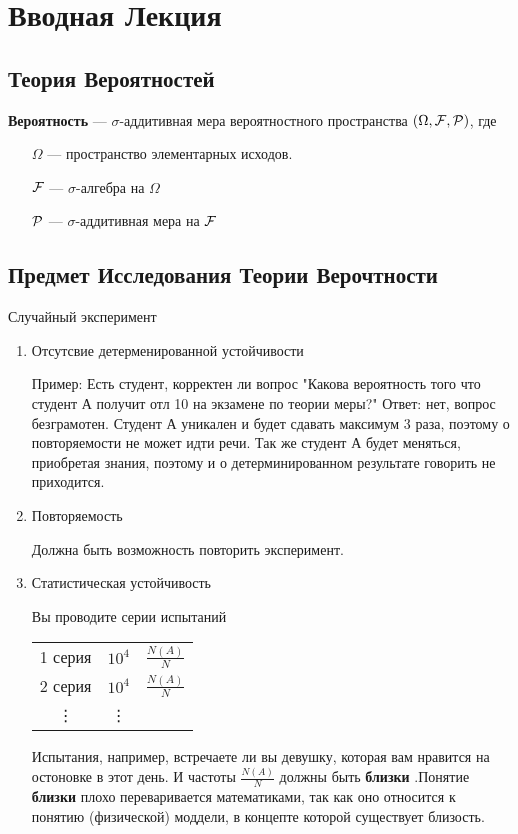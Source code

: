 \section{Вводная Лекция}

\subsection{Теория Вероятностей}

\begin{definition}
	\textbf{Вероятность} --- $\sigma$-аддитивная мера вероятностного пространства $(\Omega, \mathcal{F}, \mathcal{P})$, где
	\begin{enumerate}
		\item[$\Omega$] --- пространство элементарных исходов.
		\item[$\mathcal{F}$]  --- $\sigma$-алгебра на $\Omega$
		\item[$\mathcal{P}$] --- $\sigma$-аддитивная мера на $\mathcal{F}$
	\end{enumerate}
\end{definition}

\subsection{Предмет Исследования Теории Верочтности}

Случайный эксперимент
\begin{enumerate}
	\item Отсутсвие детерменированной устойчивости

		Пример: Есть студент, корректен ли вопрос "Какова вероятность того что студент А получит отл 10 на экзамене по теории меры?"
	Ответ: нет, вопрос безграмотен. Студент А уникален и будет сдавать максимум 3 раза, поэтому о повторяемости не может идти речи. Так же студент А будет меняться, приобретая знания, поэтому и о детерминированном результате говорить не приходится.

	\item Повторяемость

		Должна быть возможность повторить эксперимент.

	\item Статистическая устойчивость

		Вы проводите серии испытаний
		\begin{center}
		\begin{tabular}{ c c c }
			1 серия & $10^4$ & $\frac{N(A)}{N}$ \\
			2 серия & $10^4$ & $\frac{N(A)}{N}$ \\
			\vdots  & \vdots &\\
		\end{tabular}
		\end{center}
		Испытания, например, встречаете ли вы девушку, которая вам нравится на остоновке в этот день.
		И частоты  $\frac{N(A)}{N}$ должны быть \textbf{близки} .Понятие \textbf{близки} плохо переваривается математиками, так как оно относится к понятию (физической) моддели, в концепте которой существует близость.
		
\end{enumerate}

